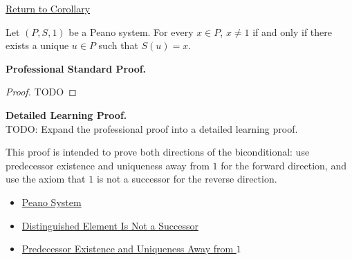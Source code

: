 \newpage
{}
\label{prf:unique-predecessor-characterization-away-from-one}

\begin{remark*}[Return]
\hyperref[cor:unique-predecessor-characterization-away-from-one]{Return to Corollary}
\end{remark*}

\begin{corollary*}
Let $(P,S,1)$ be a Peano system. For every $x \in P$, $x \neq 1$ if and
only if there exists a unique $u \in P$ such that $S(u)=x$.
\end{corollary*}

\textbf{Professional Standard Proof.}~\\
\begin{proof}
TODO
\end{proof}

\textbf{Detailed Learning Proof.}~\\
TODO: Expand the professional proof into a detailed learning proof.


\begin{remark*}
This proof is intended to prove both directions of the biconditional: use
predecessor existence and uniqueness away from $1$ for the forward direction,
and use the axiom that $1$ is not a successor for the reverse direction.
\end{remark*}

\begin{dependencies}
\begin{itemize}
  \item \hyperref[def:peano-system]{Peano System}
  \item \hyperref[ax:peano-one-not-successor]{Distinguished Element Is Not a Successor}
  \item \hyperref[cor:predecessor-exists-unique-away-from-one]{Predecessor Existence and Uniqueness Away from $1$}
\end{itemize}
\end{dependencies}

